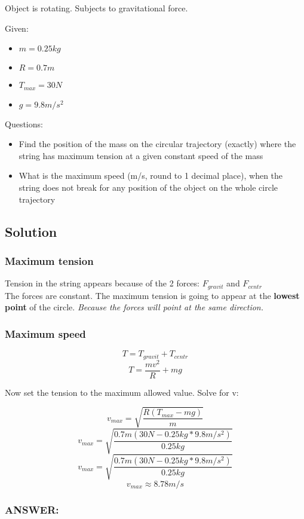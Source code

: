 
Object is rotating. Subjects to gravitational force.


\bigbreak Given: 
\begin{itemize}
    \item $  m  = 0.25kg $
    \item $ R = 0.7m $
    \item $ T_{max} = 30N $
    \item $ g = 9.8m/s^2 $
\end{itemize}


\bigbreak Questions:
\begin{itemize}
    \item Find the position of the mass on the circular trajectory (exactly) where the string has
    maximum tension at a given constant speed of the mass
    \item What is the maximum speed (m/s, round to 1 decimal place), when the string does not
    break for any position of the object on the whole circle trajectory
\end{itemize}

\subsection*{Solution}
\subsubsection*{Maximum tension}
Tension in the string appears because of the 2 forces: $F_{gravit}$ and $F_{centr}$ \\
The forces are constant. The maximum tension is going to appear at the \textbf{lowest point} of the circle.
\textit{Because the forces will point at the same direction.}


\subsubsection*{Maximum speed}
$$ T = T_{gravit} + T_{centr} $$
$$ T = \frac{mv^2}{R} + mg $$

Now set the tension to the maximum allowed value. Solve for v:

$$  v_{max} =  \sqrt{\frac{R(T_{max} - mg)}{m}} $$
$$  v_{max} =  \sqrt{\frac{0.7m(30N - 0.25kg * 9.8m/s^2)}{0.25kg}} $$
$$  v_{max} =  \sqrt{\frac{0.7m(30N - 0.25kg * 9.8m/s^2)}{0.25kg}} $$
$$  v_{max} \approx  \boxed{8.78m/s} $$

\subsubsection{ANSWER:}


